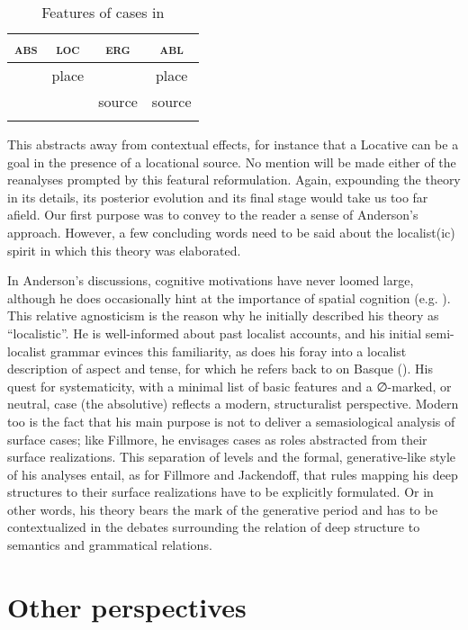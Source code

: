 \documentclass[output=paper]{langscibook}
\begin{document}
\begin{table}
\begin{tabular}{cccc}
\lsptoprule
\textsc{abs} & \textsc{loc} & \textsc{erg} & \textsc{abl}\\\midrule
& place & & place\\
& &  source & source \\
\lspbottomrule
\end{tabular}
\caption{Features of cases in \citet{anderson_case_1977}} 
\end{table}

This abstracts away from contextual effects, for instance that a Locative can be a goal in the presence of a locational source. No mention will be made either of the reanalyses prompted by this featural reformulation. Again, expounding the theory in its details, its posterior evolution and its final stage would take us too far afield. Our first purpose was to convey to the reader a sense of Anderson’s approach. However, a few concluding words need to be said about the localist(ic) spirit in which this theory was elaborated.

In Anderson’s discussions, cognitive motivations have never loomed large, although he does occasionally hint at the importance of spatial cognition (e.g. \citealt{anderson_localism_1994}). This relative agnosticism is the reason why he initially described his theory as “localistic”. He is well-informed about past localist accounts, and his initial semi-localist grammar evinces this familiarity, as does his foray into a localist description of aspect and tense, for which he refers back to \citet{darrigol_dissertation_1827} on Basque (\citealt{anderson_essay_1973}). His quest for systematicity, with a minimal list of basic features and a ∅-marked, or neutral, case (the absolutive) reflects a modern, structuralist perspective. Modern too is the fact that his main purpose is not to deliver a semasiological analysis of surface cases; like Fillmore, he envisages cases as roles abstracted from their surface realizations. This separation of levels and the formal, generative-like style of his analyses entail, as for Fillmore and Jackendoff, that rules mapping his deep structures to their surface realizations have to be explicitly formulated. Or in other words, his theory bears the mark of the generative period and has to be contextualized in the debates surrounding the relation of deep structure to semantics and grammatical relations.

\section{Other perspectives}
\end{document}
